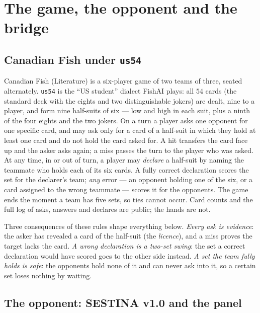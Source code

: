 \documentclass[11pt]{article}
\newcommand{\code}[1]{\texttt{#1}}
\newcommand{\usff}{\code{us54}}
\begin{document}
\section{The game, the opponent and the bridge}
\label{sec:setting}

\subsection{Canadian Fish under \usff}

Canadian Fish (Literature) is a six-player game of two teams of three, seated alternately. \usff{}
\cite{rules} is the ``US student'' dialect FishAI plays: all $54$ cards (the standard deck with the
eights and two distinguishable jokers) are dealt, nine to a player, and form nine half-suits of six ---
low and high in each suit, plus a ninth of the four eights and the two jokers. On a turn a player asks
one opponent for one specific card, and may ask only for a card of a half-suit in which they hold at
least one card and do not hold the card asked for. A hit transfers the card face up and the asker asks
again; a miss passes the turn to the player who was asked. At any time, in or out of turn, a player may
\emph{declare} a half-suit by naming the teammate who holds each of its six cards. A fully correct
declaration scores the set for the declarer's team; \emph{any} error --- an opponent holding one of the
six, or a card assigned to the wrong teammate --- scores it for the opponents. The game ends the moment
a team has five sets, so ties cannot occur. Card counts and the full log of asks, answers and declares
are public; the hands are not.

Three consequences of these rules shape everything below. \emph{Every ask is evidence}: the asker has
revealed a card of the half-suit (the \emph{licence}), and a miss proves the target lacks the card.
\emph{A wrong declaration is a two-set swing}: the set a correct declaration would have scored goes to
the other side instead. \emph{A set the team fully holds is safe}: the opponents hold none of it and can
never ask into it, so a certain set loses nothing by waiting.

\subsection{The opponent: SESTINA v1.0 and the panel}
\end{document}
